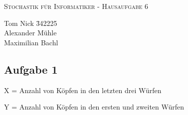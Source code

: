 \documentclass[10pt,a4paper,parskip=half]{scrartcl}
\begin{document}
\begin{center}
\textsc{\Large{Stochastik für Informatiker - Hausaufgabe 6}} \\
\end{center}
\begin{tabbing}
Tom Nick \hspace{1.4cm}\= 342225\\
Alexander Mühle\\
Maximilian Bachl
\end{tabbing}
\subsection*{Aufgabe 1}
X = Anzahl von Köpfen in den letzten drei Würfen

Y = Anzahl von Köpfen in den ersten und zweiten Würfen
\end{document}
